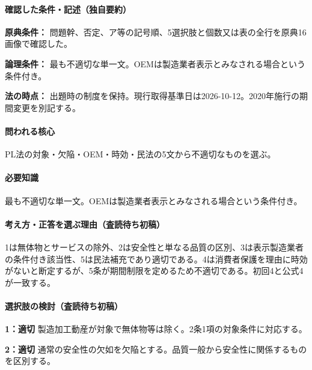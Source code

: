 \paragraph{確認した条件・記述（独自要約）}\mbox{}\par

\noindent\textbf{原典条件：} 問題幹、否定、ア等の記号順、5選択肢と個数又は表の全行を原典16画像で確認した。\par

\noindent\textbf{論理条件：} 最も不適切な単一文。OEMは製造業者表示とみなされる場合という条件付き。\par

\noindent\textbf{法の時点：} 出題時の制度を保持。現行取得基準日は2026-10-12。2020年施行の期間変更を別記する。\par

\paragraph{問われる核心} PL法の対象・欠陥・OEM・時効・民法の5文から不適切なものを選ぶ。

\paragraph{必要知識} 最も不適切な単一文。OEMは製造業者表示とみなされる場合という条件付き。

\paragraph{考え方・正答を選ぶ理由（査読待ち初稿）} 1は無体物とサービスの除外、2は安全性と単なる品質の区別、3は表示製造業者の条件付き該当性、5は民法補充であり適切である。4は消費者保護を理由に時効がないと断定するが、5条が期間制限を定めるため不適切である。初回4と公式4が一致する。

\paragraph{選択肢の検討（査読待ち初稿）}\mbox{}\par

\noindent\textbf{1：適切} 製造加工動産が対象で無体物等は除く。2条1項の対象条件に対応する。\par

\noindent\textbf{2：適切} 通常の安全性の欠如を欠陥とする。品質一般から安全性に関係するものを区別する。\par

